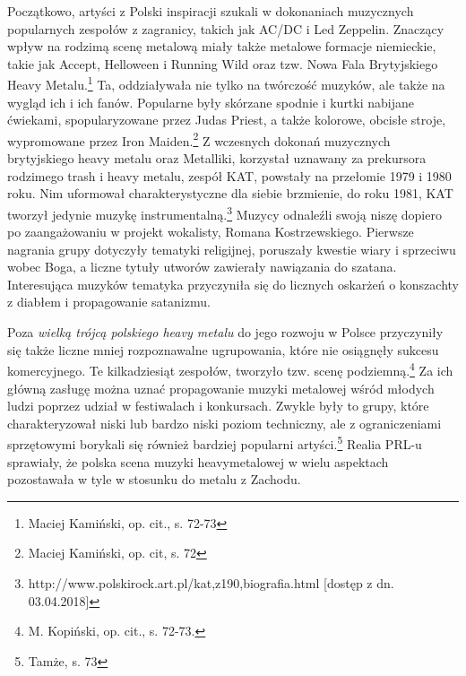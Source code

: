 \documentclass[12pt, a4paper, titlepage]{report}
\begin{document}
Początkowo, artyści z Polski inspiracji szukali w dokonaniach muzycznych popularnych zespołów z zagranicy, takich jak AC/DC i Led Zeppelin.  Znaczący wpływ na rodzimą scenę metalową miały także metalowe formacje niemieckie, takie jak Accept, Helloween i Running Wild oraz tzw. Nowa Fala Brytyjskiego Heavy Metalu.\footnote{Maciej Kamiński, op. cit., s. 72-73} Ta, oddziaływała nie tylko na twórczość muzyków, ale także na wygląd ich i ich fanów. Popularne były skórzane spodnie i kurtki nabijane ćwiekami, spopularyzowane przez Judas Priest, a także kolorowe, obcisłe stroje, wypromowane przez Iron Maiden.\footnote{Maciej Kamiński, op. cit, s. 72} Z wczesnych dokonań muzycznych brytyjskiego heavy metalu oraz Metalliki, korzystał uznawany za prekursora rodzimego trash i heavy metalu, zespół KAT, powstały na przełomie 1979 i 1980 roku. Nim uformował charakterystyczne dla siebie brzmienie, do roku 1981, KAT tworzył jedynie muzykę instrumentalną.\footnote{http://www.polskirock.art.pl/kat,z190,biografia.html [dostęp z dn. 03.04.2018]} Muzycy odnaleźli swoją niszę dopiero po zaangażowaniu w projekt wokalisty, Romana Kostrzewskiego. Pierwsze nagrania grupy dotyczyły tematyki religijnej, poruszały kwestie wiary i sprzeciwu wobec Boga, a liczne tytuły utworów zawierały nawiązania do szatana. Interesująca muzyków tematyka przyczyniła się do licznych oskarżeń o konszachty z diabłem i propagowanie satanizmu. 

Poza \emph{wielką trójcą polskiego heavy metalu} do jego rozwoju w Polsce przyczyniły się także liczne mniej rozpoznawalne ugrupowania, które nie osiągnęły sukcesu komercyjnego. Te kilkadziesiąt zespołów, tworzyło tzw. scenę podziemną.\footnote{M. Kopiński, op. cit., s. 72-73.} Za ich główną zasługę można uznać propagowanie muzyki metalowej wśród młodych ludzi poprzez udział w festiwalach i konkursach. Zwykle były to grupy, które charakteryzował niski lub bardzo niski poziom techniczny, ale z ograniczeniami sprzętowymi borykali się również bardziej popularni artyści.\footnote{Tamże, s. 73} Realia PRL-u sprawiały, że polska scena muzyki heavymetalowej w wielu aspektach pozostawała w tyle w stosunku do metalu z Zachodu.
\end{document}
